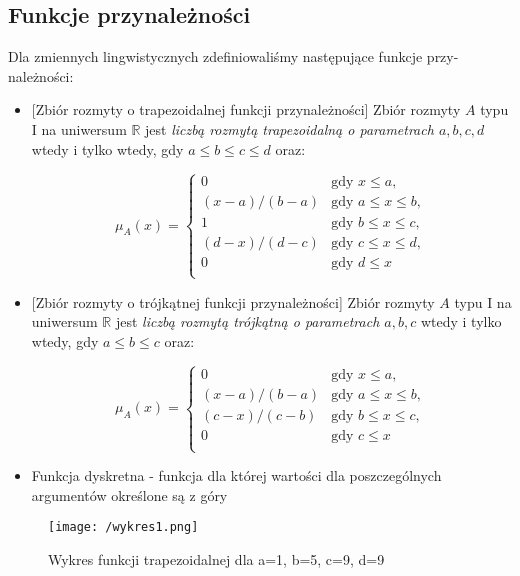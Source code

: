\documentclass{classrep}
\begin{document}
\subsection{Funkcje przynależności}
Dla zmiennych lingwistycznych zdefiniowaliśmy następujące funkcje przy-
należności:
\begin{itemize}
    \item{
        [Zbiór rozmyty o trapezoidalnej funkcji przynależności]
        Zbiór rozmyty \(A\) typu I na uniwersum \(\mathbb{R}\) jest
        \emph{liczbą rozmytą trapezoidalną o parametrach \(a, b, c, d\)} wtedy i tylko
        wtedy, gdy \(a \leqslant b \leqslant c \leqslant d\) oraz:
        
        \[\mu_A(x) = \begin{cases}
        0                 & \mbox{gdy } x \leqslant a, \\
        (x - a) / (b - a) & \mbox{gdy } a \leqslant x \leqslant b, \\
        1                 & \mbox{gdy } b \leqslant x \leqslant c, \\
        (d - x) / (d - c) & \mbox{gdy } c \leqslant x \leqslant d, \\
        0                 & \mbox{gdy } d \leqslant x \\
        \end{cases}\]
    }
    \item{
        [Zbiór rozmyty o trójkątnej funkcji przynależności]
        Zbiór rozmyty \(A\) typu I na uniwersum \(\mathbb{R}\) jest
        \emph{liczbą rozmytą trójkątną o parametrach \(a, b, c\)} wtedy i tylko
        wtedy, gdy \(a \leq b \leq c\) oraz:
        
        \[\mu_A(x) = \begin{cases}
        0                 & \mbox{gdy } x \leqslant a, \\
        (x - a) / (b - a) & \mbox{gdy } a \leqslant x \leqslant b, \\
        (c - x) / (c - b) & \mbox{gdy } b \leqslant x \leqslant c, \\
        0                 & \mbox{gdy } c \leqslant x \\
        \end{cases}\]
    }
    \item{Funkcja dyskretna - funkcja dla której wartości dla poszczególnych argumentów określone są z góry}

\end{itemize}

\begin{figure}[H]
    \centering
    \texttt{[image: /wykres1.png]}
    \caption{Wykres funkcji trapezoidalnej dla a=1, b=5, c=9, d=9}
\end{figure}
\end{document}
